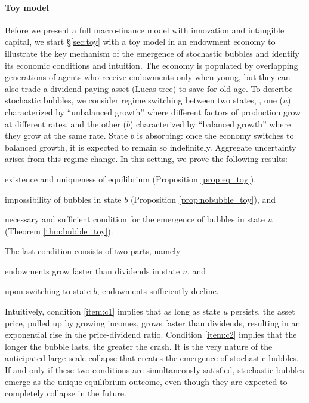 \documentclass[a4paper,12pt]{article}
\numberwithin{equation}{section}
\theoremstyle{plain}
\begin{document}
\paragraph{Toy model}
Before we present a full macro-finance model with innovation and intangible capital, we start \S\ref{sec:toy} with a toy model in an endowment economy to illustrate the key mechanism of the emergence of stochastic bubbles and identify its economic conditions and intuition. The economy is populated by overlapping generations of agents who receive endowments only when young, but they can also trade a dividend-paying asset (Lucas tree) to save for old age. To describe stochastic bubbles, we consider regime switching between two states, \ie, one ($u$) characterized by ``unbalanced growth'' where different factors of production grow at different rates, and the other ($b$) characterized by ``balanced growth'' where they grow at the same rate. State $b$ is absorbing: once the economy switches to balanced growth, it is expected to remain so indefinitely. Aggregate uncertainty arises from this regime change. In this setting, we prove the following results:
\begin{enumerate*}
    \item existence and uniqueness of equilibrium (Proposition \ref{prop:eq_toy}),
    \item impossibility of bubbles in state $b$ (Proposition \ref{prop:nobubble_toy}), and
    \item necessary and sufficient condition for the emergence of bubbles in state $u$ (Theorem \ref{thm:bubble_toy}).
\end{enumerate*}
The last condition consists of two parts, namely
\begin{enumerate*}
    \item\label{item:c1} endowments grow faster than dividends in state $u$, and
    \item\label{item:c2} upon switching to state $b$, endowments sufficiently decline.
\end{enumerate*}
Intuitively, condition \ref{item:c1} implies that as long as state $u$ persists, the asset price, pulled up by growing incomes, grows faster than dividends, resulting in an exponential rise in the price-dividend ratio. Condition \ref{item:c2} implies that the longer the bubble lasts, the greater the crash. It is the very nature of the anticipated large-scale collapse that creates the emergence of stochastic bubbles. If and only if these two conditions are simultaneously satisfied, stochastic bubbles emerge as the unique equilibrium outcome, even though they are expected to completely collapse in the future.
\end{document}
